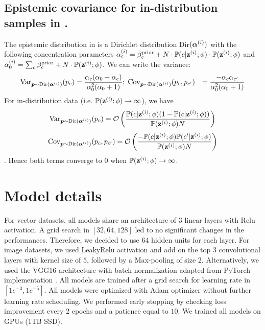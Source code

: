 \subsection{Epistemic covariance for in-distribution samples in \PostNetacro.}
\label{epistemic_variance_proof}

The epistemic distribution in \PostNetacro is a Dirichlet distribution Dir$(\bm{\alpha}^{(i)})$ with the following concentration parameters $\alpha_c^{(i)} = \beta_c^\text{prior} + N \cdot \mathbb{P}(c | \mathbf{z}^{(i)}; \phi) \cdot \mathbb{P}(\mathbf{z}^{(i)}; \phi)$ and $\alpha_0^{(i)} = \sum_c \beta_c^\text{prior} + N \cdot \mathbb{P}(\mathbf{z}^{(i)}; \phi)$. We can write the variance:
\begin{equation}
\begin{aligned}
\text{Var}_{\bm{p}\sim \mathrm{Dir}(\boldsymbol{\alpha}^{(i)})}(p_c) & = \frac{\alpha_c (\alpha_0 - \alpha_c)}{\alpha_0^2 (\alpha_0 + 1)}; \; \text{Cov}_{\bm{p}\sim \mathrm{Dir}(\boldsymbol{\alpha}^{(i)})}(p_c, p_{c'}) & = \frac{-\alpha_c\alpha_{c'}}{\alpha_0^2 (\alpha_0 + 1)}
\end{aligned}
\end{equation}
For in-distribution data (i.e. $\mathbb{P}(\mathbf{z}^{(i)}; \phi) \rightarrow \infty$), we have 
$$\text{Var}_{\bm{p}\sim \mathrm{Dir}(\boldsymbol{\alpha}^{(i)})}(p_c) = \mathcal{O}\left(\frac{\mathbb{P}(c | \mathbf{z}^{(i)}; \phi)(1-\mathbb{P}(c | \mathbf{z}^{(i)}; \phi))}{\mathbb{P}(\mathbf{z}^{(i)}; \phi) N}\right)$$
$$\text{Cov}_{\bm{p}\sim \mathrm{Dir}(\boldsymbol{\alpha}^{(i)})}(p_c, p_{c'}) = \mathcal{O}\left(\frac{-\mathbb{P}(c | \mathbf{z}^{(i)}; \phi)\mathbb{P}(c' | \mathbf{z}^{(i)}; \phi)}{\mathbb{P}(\mathbf{z}^{(i)}; \phi)N}\right)$$. 
Hence both terms converge to $0$ when $\mathbb{P}(\mathbf{z}^{(i)}; \phi) \rightarrow \infty$.

\section{Model details}
\label{model_detais}

For vector datasets, all models share an architecture of 3 linear layers with Relu activation. A grid search in $[32, 64, 128]$ led to no significant changes in the performances. Therefore, we decided to use $64$ hidden units for each layer. For image datasets, we used LeakyRelu activation and add on the top 3 convolutional layers with kernel size of $5$, followed by a Max-pooling of size $2$. Alternatively, we used the VGG16 architecture with batch normalization \cite{vgg} adapted from PyTorch implementation \cite{pytorch}. All models are trained after a grid search for learning rate in $[1e^{-3}, 1e^{-5}]$. All models were optimized with Adam optimizer without further learning rate scheduling. We performed early stopping by checking loss improvement every $2$ epochs and a patience equal to $10$. We trained all models on GPUs (1TB SSD).

